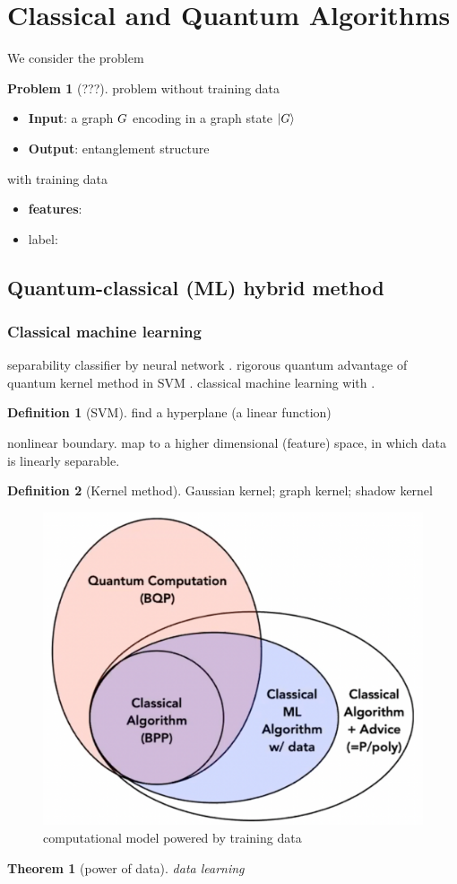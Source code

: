 \documentclass[
aps,
pra,
linenumbers,
floatfix,
]{revtex4-2}
\theoremstyle{plain}
\newtheorem{theorem}{Theorem}
\theoremstyle{definition}
\newtheorem{definition}{Definition}
\newtheorem{problem}{Problem}
\begin{document}
\section{Classical and Quantum Algorithms}
We consider the problem 
\begin{problem}[???]
	problem without training data
	\begin{itemize}
		\item \textbf{Input}: a graph $G$ encoding in a graph state $\ket{G}$
		\item \textbf{Output}: entanglement structure
	\end{itemize}
	with training data
	\begin{itemize}
		\item \textbf{features}:
		\item label: 
	\end{itemize}
\end{problem}

\subsection{Quantum-classical (ML) hybrid method}
\subsubsection{Classical machine learning}
separability classifier by neural network \cite{luSeparabilityEntanglementClassifierMachine2018}.
rigorous quantum advantage of quantum kernel method in SVM \cite{liuRigorousRobustQuantum2021}.
classical machine learning with  \cite{huangProvablyEfficientMachine2021}.
\begin{definition}[SVM]
	find a hyperplane (a linear function)
\end{definition}
nonlinear boundary. map to a higher dimensional (feature) space, in which data is linearly separable.
\begin{definition}[Kernel method]
	Gaussian kernel; 
	graph kernel;
	shadow kernel
\end{definition}
\begin{figure}[!ht]
	\centering
	\includegraphics[width=.35\linewidth]{data.png}
	\caption{computational model powered by training data}
\end{figure}
\begin{theorem}[power of data]
	data learning
\end{theorem}
\end{document}
